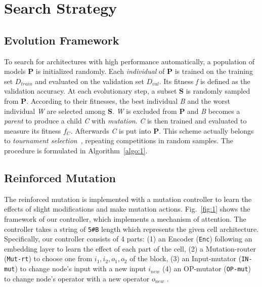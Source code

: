 \documentclass[10pt,twocolumn,letterpaper]{article}
\begin{document}
\section{Search Strategy}
\label{4}
\subsection{Evolution Framework}
\label{4.1}

 To search for architectures with high performance automatically, a population of models $\mathbf{P}$ is initialized randomly.
 Each \emph{individual} of $\mathbf{P}$ is trained on the training set $D_{train}$ and evaluated on the validation set $D_{val}$.
 Its fitness \emph{f} is defined as the validation accuracy. At each evolutionary step, a subset $\mathbf{S}$ is randomly sampled from $\mathbf{P}$.
 According to their fitnesses, the best individual \emph{B} and the worst individual \emph{W} are selected among $\mathbf{S}$.
 \emph{W} is excluded from $\mathbf{P}$ and \emph{B} becomes a \emph{parent} to produce a child \emph{C} with \emph{mutation}.
  \emph{C} is then trained and evaluated to measure its fitness $f_C$. Afterwards \emph{C} is put into $\mathbf{P}$. This scheme actually belongs to \emph{tournament selection}~\cite{goldberg1991comparative}, repeating competitions in random samples. The procedure is formulated in Algorithm~\ref{algo:1}. %

\subsection{Reinforced Mutation}
\label{4.2}
The reinforced mutation is implemented with a mutation controller to learn the effects of slight modifications and make mutation actions.
Fig.~\ref{fig:1} shows the framework of our controller, which implements a mechanism of attention. The controller takes a string of \texttt{5\#B} length which represents the given cell architecture. Specifically, our controller consists of 4 parts:
(1) an Encoder (\texttt{Enc}) following an embedding layer to learn the effect of each part of the cell,
(2) a Mutation-router (\texttt{Mut-rt}) to choose one from $i_1,i_2,o_1,o_2$ of the block,
(3) an Input-mutator (\texttt{IN-mut}) to change node's input with a new input $i_{new}$
(4) an OP-mutator (\texttt{OP-mut}) to change node's operator with a new operator $o_{new}$ .
\end{document}
